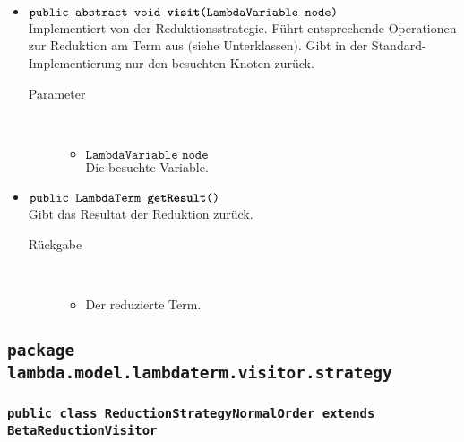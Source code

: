\begin{description}
\begin{itemize}
		\item $\texttt{public abstract void \textbf{visit}(LambdaVariable node)}$ \\ Implementiert von der Reduktionsstrategie. Führt entsprechende Operationen zur Reduktion am Term aus $($siehe Unterklassen$)$. Gibt in der Standard-Implementierung nur den besuchten Knoten zurück.
		\begin{description}
			\item[Parameter] \hfill \\
			\vspace{-.8cm}
			\begin{itemize}
				\item $\texttt{LambdaVariable node}$ \\ Die besuchte Variable.
			\end{itemize}
		\end{description}
		
		\item $\texttt{public LambdaTerm \textbf{getResult}()}$ \\ Gibt das Resultat der Reduktion zurück.
		\begin{description}
			\item[Rückgabe] \hfill \\
			\vspace{-.8cm}
			\begin{itemize}
				\item Der reduzierte Term.
			\end{itemize}
		\end{description}
	\end{itemize}
\end{description}

\subsection{\texttt{package lambda.model.lambdaterm.visitor.strategy}}

\subsubsection{\normalfont \texttt{public class \textbf{ReductionStrategyNormalOrder} extends BetaReductionVisitor}}

